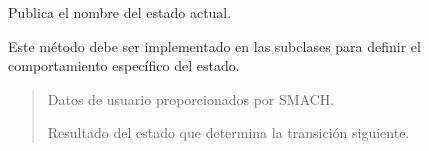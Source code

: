 \documentclass[a4paper,10pt,spanish]{sphinxmanual}
\begin{document}
\begin{fulllineitems}
\begin{fulllineitems}
\end{fulllineitems}


\begin{fulllineitems}
\label{\detokenize{squad_state_manager:squad_state_manager.BaseState.execute}}
\pysigstartsignatures
{}
\pysigstopsignatures
\sphinxAtStartPar
Publica el nombre del estado actual.

\sphinxAtStartPar
Este método debe ser implementado en las subclases para definir el comportamiento específico del estado.
\begin{quote}\begin{description}
\sphinxAtStartPar
{} \textendash{} Datos de usuario proporcionados por SMACH.

\sphinxAtStartPar
Resultado del estado que determina la transición siguiente.

\sphinxAtStartPar
{}

\end{description}\end{quote}

\end{fulllineitems}


\end{fulllineitems}

\end{document}
